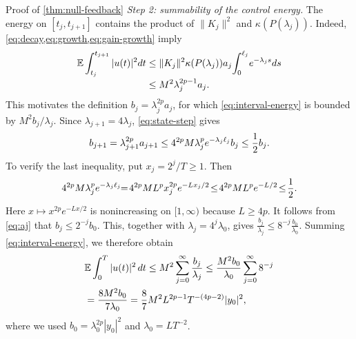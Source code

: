 \documentclass[twocolumn]{autart}
\begin{document}
\begin{pf*}{Proof of \cref{thm:null-feedback}}
\emph{Step 2: summability of the control energy.}
The energy on $[t_j,t_{j+1}]$ contains the product of
$\lVert K_j\rVert^2$ and $\kappa(P(\lambda_j))$. Indeed,
\cref{eq:decay,eq:growth,eq:gain-growth} imply\vspace{-2mm}
\begin{equation}\label{eq:interval-energy}
\begin{aligned}
\mathbb E\int_{t_j}^{t_{j+1}}|u(t)|^2 dt
&\leq\lVert K_j\rVert^2\kappa(P(\lambda_j))a_j\!
\int_0^{\ell_j}\!e^{-\lambda_js} ds\\[-2pt]
&\leq M^2\lambda_j^{2p-1}a_j.
\end{aligned}\vspace{-2mm}
\end{equation}
This motivates the definition $b_j=\lambda_j^{2p}a_j$, for which
\cref{eq:interval-energy} is bounded by $M^2b_j/\lambda_j$. Since
$\lambda_{j+1}=4\lambda_j$, \cref{eq:state-step} gives\vspace{-3mm}
\begin{equation}\label{eq:aj}
b_{j+1}
=\lambda_{j+1}^{2p}a_{j+1}
\leq 4^{2p}M\lambda_j^pe^{-\lambda_j\ell_j}b_j
\leq\frac12b_j.\vspace{-3mm}
\end{equation}
To verify the last inequality, put $x_j=2^j/T\geq1$. Then\vspace{-2mm}
\begin{equation*}
4^{2p}M\lambda_j^pe^{-\lambda_j\ell_j}
\!\!=\!4^{2p}ML^px_j^{2p}e^{-Lx_j/2} \!\leq\!4^{2p}ML^pe^{-L/2}\!\leq\!\frac12.\vspace{-2mm}
\end{equation*}
Here $x\mapsto x^{2p}e^{-Lx/2}$ is nonincreasing on $[1,\infty)$
because $L\geq4p$. It follows from \cref{eq:aj} that
$b_j\leq2^{-j}b_0$.  This, together with $\lambda_j=4^j\lambda_0$,
gives
$
\frac{b_j}{\lambda_j}\leq8^{-j}\frac{b_0}{\lambda_0}.
$
Summing \cref{eq:interval-energy}, we therefore obtain\vspace{-2mm}
\begin{equation}\label{eq:switching-energy}
\begin{aligned}
&\mathbb E\int_0^T|u(t)|^2\,dt
\leq M^2\sum_{j=0}^\infty\frac{b_j}{\lambda_j}
\leq\frac{M^2b_0}{\lambda_0}\sum_{j=0}^\infty8^{-j} \\
&=\frac{8M^2b_0}{7\lambda_0}
=\frac87M^2L^{2p-1}T^{-(4p-2)}|y_0|^2,
\end{aligned}\vspace{-2mm}
\end{equation}
where we used $b_0=\lambda_0^{2p}|y_0|^2$ and
$\lambda_0=LT^{-2}$.


\end{pf*}
\end{document}
